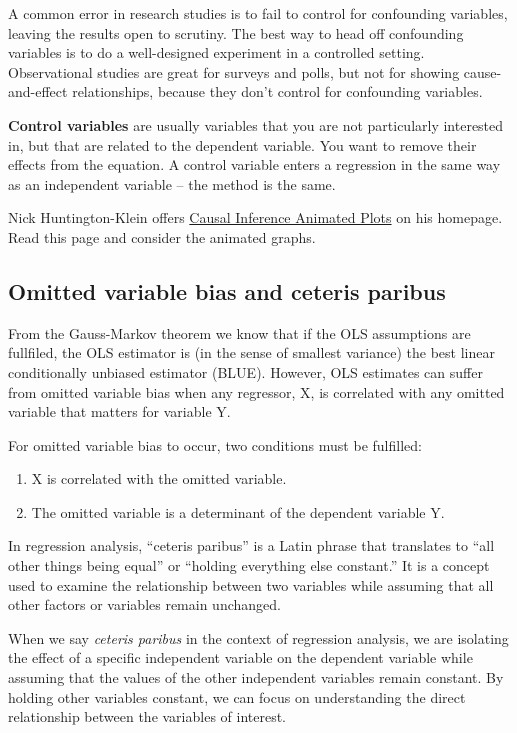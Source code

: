 \documentclass[
  12pt,
  oneside]{book}
\providecommand{\tightlist}{%
  \setlength{\itemsep}{0pt}\setlength{\parskip}{0pt}}
\theoremstyle{definition}
\theoremstyle{definition}
\theoremstyle{definition}
\theoremstyle{definition}
\theoremstyle{remark}
\begin{document}
A common error in research studies is to fail to control for confounding variables, leaving the results open to scrutiny. The best way to head off confounding variables is to do a well-designed experiment in a controlled setting. Observational studies are great for surveys and polls, but not for showing cause-and-effect relationships, because they don't control for confounding variables.

\textbf{Control variables} are usually variables that you are not particularly interested in, but that are related to the dependent variable. You want to remove their effects from the equation. A control variable enters a regression in the same way as an independent variable -- the method is the same.

Nick Huntington-Klein offers \href{https://www.nickchk.com/causalgraphs.html}{Causal Inference Animated Plots} on his homepage. Read this page and consider the animated graphs.

\hypertarget{omitted-variable-bias-and-ceteris-paribus}{%
\subsection{Omitted variable bias and ceteris paribus}\label{omitted-variable-bias-and-ceteris-paribus}}

From the Gauss-Markov theorem we know that if the OLS assumptions are fullfiled, the OLS estimator is (in the sense of smallest variance) the best linear conditionally unbiased estimator (BLUE).
However, OLS estimates can suffer from omitted variable bias when any regressor, X, is correlated with any omitted variable that matters for variable Y.

For omitted variable bias to occur, two conditions must be fulfilled:

\begin{enumerate}
\def\labelenumi{\arabic{enumi}.}
\tightlist
\item
  X is correlated with the omitted variable.
\item
  The omitted variable is a determinant of the dependent variable Y.
\end{enumerate}

In regression analysis, ``ceteris paribus'' is a Latin phrase that translates to ``all other things being equal'' or ``holding everything else constant.'' It is a concept used to examine the relationship between two variables while assuming that all other factors or variables remain unchanged.

When we say \emph{ceteris paribus} in the context of regression analysis, we are isolating the effect of a specific independent variable on the dependent variable while assuming that the values of the other independent variables remain constant. By holding other variables constant, we can focus on understanding the direct relationship between the variables of interest.
\end{document}
